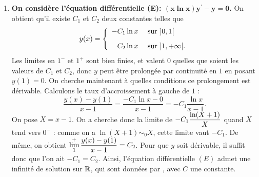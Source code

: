 \documentclass[a4paper, 11pt,reqno]{article}
\begin{document}
\begin{correction}
\begin{enumerate}
$$\begin{array}{rl}
\end{array} \right.$$
On veut prolonger cette fonction en $-1$ et $1$ pour obtenir une fonction d\'erivable. Il faut en particulier que les limites \`a gauche et \`a droite soient finies. Regardons par exemple en $-1^-$ : on a $\lim\limits_{-1^-} x^2-1 = 0$, donc pour avoir une limite finie en $-1^-$, il faut que le num\'erateur tende vers $0$ \'egalement. Or on a $\lim\limits_{-1^-} C_1 - \ddp \frac{x^3}{3} = 0$ si et seulement si $C_1= -\frac{1}{3}$. Dans ce cas, la fonction $y$ s'\'ecrit :
$$y(x)=\frac{1}{3} \times \frac{1+x^3}{x^2-1} = \frac{1}{3} \times \frac{1+x+x^2}{1+x},$$
et a bien une limite finie en $-1^-$.\\
On trouve de m\^eme que pour avoir une limite finie en $-1^+$, il faut n\'ecessairement avoir $C_2=-\ddp \frac{1}{3}$. On peut donc avoir un raccord en $-1$, et obtenir comme solution , dont on v\'erifie qu'elle est bien d\'erivable sur $]-\infty, 1[ $.\\
On montre de m\^eme que l'on peut avoir un raccord en $1$ en prenant cette fois $C_2=\frac{1}{3}$, et $C_3=\frac{1}{3}$. La solution sur $]-1, +\infty[$ est cette fois .\\
Cependant, on ne peut pas avoir un raccord \`a la fois en $-1$ et en $1$. En effet, les conditions pour les raccords sont incompatibles : il faudrait avoir \`a la fois $C_2=-\ddp \frac{1}{3}$ et $C_2=\ddp \frac{1}{3}$, ce qui est impossible.
\item \textbf{On consid\`ere l'\'equation diff\'erentielle (E): $\mathbf{(x\ln{x})y^{\prime}-y=0}$.}
On obtient qu'il existe $C_1$ et $C_2$ deux constantes telles que
$$y(x) = \left\{ \begin{array}{rl}
\ddp -C_1 \ln x & \textmd{ sur } ]0,1[\vsec\\
\ddp C_2 \ln x & \textmd{ sur } ]1,+\infty[.
\end{array} \right.$$
Les limites en $1^-$ et $1^+$ sont bien finies, et valent $0$ quelles que soient les valeurs de $C_1$ et $C_2$, donc $y$ peut \^etre prolong\'ee par continuit\'e en $1$ en posant $y(1)=0$. On cherche maintenant \`a quelles conditions ce prolongement est d\'erivable. Calculons le taux d'accroissement \`a gauche de $1$ :
$$\frac{y(x)-y(1)}{x-1} = \frac{-C_1 \ln x - 0}{x-1} = -C_1 \frac{\ln x}{x-1}.$$
On pose $X=x-1$. On a cherche donc la limite de $\displaystyle -C_1 \frac{\ln (X+1)}{X}$ quand $X$ tend vers $0^-$ : comme on a $\ln(X+1) \sim_0 X$, cette limite vaut $-C_1$. De m\^eme, on obtient $\lim\limits_1^+ \displaystyle \frac{y(x)-y(1)}{x-1} = C_2$. Pour que $y$ soit d\'erivable, il suffit donc que l'on ait $-C_1= C_2$. Ainsi, l'\'equation diff\'erentielle $(E)$ admet une infinit\'e de solution sur $\mathbb{R}$, qui sont donn\'ees par \fbox{$y: x\in \; ]0,+\infty[ \; \mapsto C \ln x$}, avec $C$ une constante.

\end{enumerate}
\end{correction}
\end{document}
